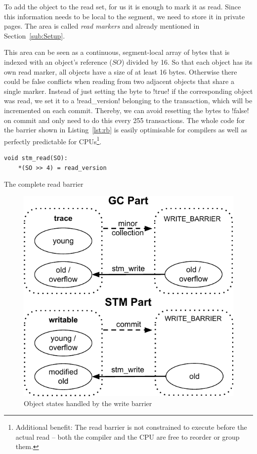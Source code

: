 \documentclass{sigplanconf}
\makeatletter
\renewcommand\lstinline[1][]{%
  \Collectverb{\@@myverb}%
}
\def\@@myverb#1{%
    \begingroup
    \fboxsep=0.2em
    \colorbox{verylightgray}{\oldlstinline|#1|}%
    \endgroup
}
\makeatother
\begin{document}
To add the object to the read set, for us it is enough to mark it as
read. Since this information needs to be local to the segment, we need
to store it in private pages. The area is called \emph{read markers}
and already mentioned in Section~\ref{sub:Setup}.

This area can be seen as a continuous, segment-local array of bytes
that is indexed with an object's reference ($SO$) divided by 16. So
that each object has its own read marker, all objects have a size of
at least 16 bytes. Otherwise there could be false conflicts when
reading from two adjacent objects that share a single marker.
Instead of just setting the byte to \lstinline!true!  if the
corresponding object was read, we set it to a \lstinline!read_version!
belonging to the transaction, which will be incremented on each
commit.  Thereby, we can avoid resetting the bytes to
\lstinline!false!  on commit and only need to do this every 255
transactions. The whole code for the barrier shown in
Listing~\ref{lst:rb} is easily optimisable for compilers as well as
perfectly predictable for CPUs\footnote{Additional benefit: The read
barrier is not constrained to execute before the actual read -- both
the compiler and the CPU are free to reorder or group them.}.

\begin{code}[h]
\begin{lstlisting}
void stm_read(SO):
    *(SO >> 4) = read_version
\end{lstlisting}
\caption{The complete read barrier\label{lst:rb}}
\end{code}

\begin{figure}[h]
  \centering
  \includegraphics[width=0.8\columnwidth]{object_states.pdf}
  \caption{Object states handled by the write barrier\label{fig:obj_states}}
\end{figure}
\end{document}

